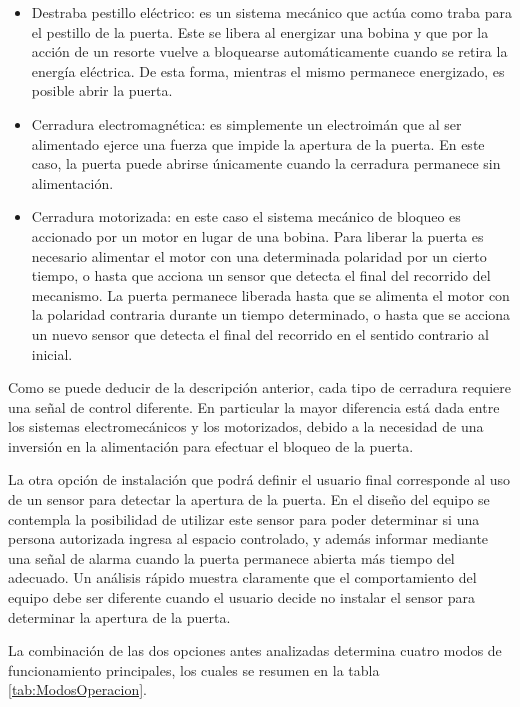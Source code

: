 \begin{itemize}
	\item Destraba pestillo eléctrico: es un sistema mecánico que actúa como traba para el pestillo de la puerta. Este se libera al energizar una bobina y que por la acción de un resorte vuelve a bloquearse automáticamente cuando se retira la energía eléctrica. De esta forma, mientras el mismo permanece energizado, es posible abrir la puerta.
	
	\item Cerradura electromagnética: es simplemente un electroimán que al ser alimentado ejerce una fuerza que impide la apertura de la puerta. En este caso, la puerta puede abrirse únicamente cuando la cerradura permanece sin alimentación.
	
	\item Cerradura motorizada: en este caso el sistema mecánico de bloqueo es accionado por un motor en lugar de una bobina. Para liberar la puerta es necesario alimentar el motor con una determinada polaridad por un cierto tiempo, o hasta que acciona un sensor que detecta el final del recorrido del mecanismo. La puerta permanece liberada hasta que se alimenta el motor con la polaridad contraria durante un tiempo determinado, o hasta que se acciona un nuevo sensor que detecta el final del recorrido en el sentido contrario al inicial.
\end{itemize}

Como se puede deducir de la descripción anterior, cada tipo de cerradura requiere una señal de control diferente. En particular la mayor diferencia está dada entre los sistemas electromecánicos y los motorizados, debido a la necesidad de una inversión en la alimentación para efectuar el bloqueo de la puerta. 

La otra opción de instalación que podrá definir el usuario final corresponde al uso de un sensor para detectar la apertura de la puerta. En el diseño del equipo se contempla la posibilidad de utilizar este sensor para poder determinar si una persona autorizada ingresa al espacio controlado, y además informar mediante una señal de alarma cuando la puerta permanece abierta más tiempo del adecuado. Un análisis rápido muestra claramente que el comportamiento del equipo debe ser diferente cuando el usuario decide no instalar el sensor para determinar la apertura de la puerta.  

La combinación de las dos opciones antes analizadas determina cuatro modos de funcionamiento principales, los cuales se resumen en la tabla \ref{tab:ModosOperacion}.

